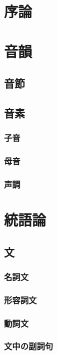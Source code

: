 \section{序論}
\newpage

\section{音韻}
\subsection{音節}
\subsection{音素}
\subsubsection{子音}
\subsubsection{母音}
\subsubsection{声調}
\newpage

\section{統語論}
\subsection{文}
\subsubsection{名詞文}
\subsubsection{形容詞文}
\subsubsection{動詞文}
\subsubsection{文中の副詞句}
